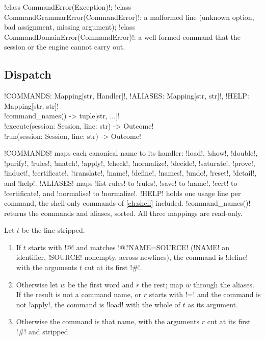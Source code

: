 \begin{signature}
\py!class CommandError(Exception)!; \py!class CommandGrammarError(CommandError)!: a malformed line (unknown option, bad assignment, missing argument); \py!class CommandDomainError(CommandError)!: a well-formed command that the session or the engine cannot carry out.
\end{signature}

\subsection{Dispatch}\label{sec:language-dispatch}

\begin{signature}
\py!COMMANDS: Mapping[str, Handler]!, \py!ALIASES: Mapping[str, str]!, \py!HELP: Mapping[str, str]!\\
\py!command_names() -> tuple[str, ...]!\\
\py!execute(session: Session, line: str) -> Outcome!\\
\py!run(session: Session, line: str) -> Outcome!
\end{signature}

\py!COMMANDS! maps each canonical name to its handler: \azx!load!, \azx!show!, \azx!double!, \azx!purify!, \azx!rules!, \azx!match!, \azx!apply!, \azx!check!, \azx!normalize!, \azx!decide!, \azx!saturate!, \azx!prove!, \azx!induct!, \azx!certificate!, \azx!translate!, \azx!name!, \azx!define!, \azx!names!, \azx!undo!, \azx!reset!, \azx!detail!, and \azx!help!. \py!ALIASES! maps \code!list-rules! to \azx!rules!, \code!save! to \azx!name!, \code!cert! to \azx!certificate!, and \code!normalise! to \azx!normalize!. \py!HELP! holds one usage line per command, the shell-only commands of \cref{ch:shell} included. \py!command_names()! returns the commands and aliases, sorted. All three mappings are read-only.

\begin{algorithm}\label{alg:language-split}
\leavevmode
Let $t$ be the line stripped.
\begin{enumerate}
\item If $t$ starts with \code!@! and matches \code!@?NAME\s*=\s*SOURCE! (\code!NAME! an identifier, \code!SOURCE! nonempty, across newlines), the command is \azx!define! with the arguments $t$ cut at its first \code!#!.
\item Otherwise let $w$ be the first word and $r$ the rest; map $w$ through the aliases. If the result is not a command name, or $r$ starts with \code!=! and the command is not \azx!apply!, the command is \azx!load! with the whole of $t$ as its argument.
\item Otherwise the command is that name, with the arguments $r$ cut at its first \code!#! and stripped.
\end{enumerate}
\end{algorithm}

